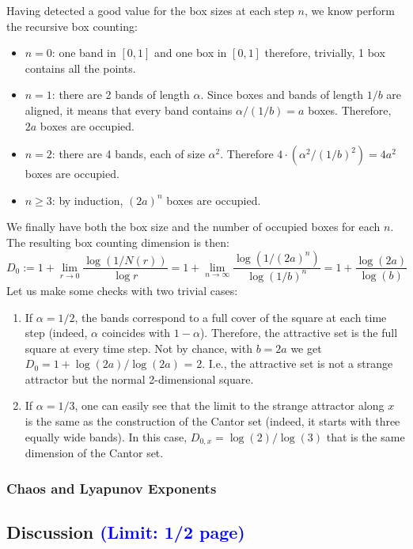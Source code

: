 \documentclass[11pt,titlepage]{article}
\begin{document}
Having detected a good value for the box sizes at each step $n$, we know perform the recursive box counting:
\begin{itemize}
	\item $n=0$: one band in $[0,1]$ and one box in $[0,1]$ therefore, trivially, 1 box contains all the points.
	\item $n=1$: there are 2 bands of length $\alpha$. Since boxes and bands of length $1/b$ are aligned, it means that every band contains $\alpha/(1/b) = a$ boxes. Therefore, $2a$ boxes are occupied.
	\item $n=2$: there are 4 bands, each of size $\alpha^2$. Therefore $4 \cdot (\alpha^2 / (1/b)^2) = 4a^2$ boxes are occupied.
	\item $n \ge 3$: by induction, $(2a)^n$ boxes are occupied.
\end{itemize}
We finally have both the box size and the number of occupied boxes for each $n$. The resulting box counting dimension is then:
\begin{equation*}
	D_0 := 1 + \lim_{r\rightarrow 0}\frac{\log(1/N(r))}{\log{r}} = 1 + \lim_{n\rightarrow \infty}\frac{\log(1/(2a)^n)}{\log{(1/b)^n}} = 1 + \frac{\log(2a)}{\log(b)}
\end{equation*}
Let us make some checks with two trivial cases:
 \begin{enumerate}
 	\item If $\alpha=1/2$, the bands correspond to a full cover of the square at each time step (indeed, $\alpha$ coincides with $1-\alpha$). Therefore, the attractive set is the full square at every time step. Not by chance, with $b=2a$ we get $D_0 = 1 + \log(2a)/\log(2a)$ = 2. I.e., the attractive set is not a strange attractor but the normal 2-dimensional square. 
 	\item If $\alpha=1/3$, one can easily see that the limit to the strange attractor along $x$ is the same as the construction of the Cantor set (indeed, it starts with three equally wide bands). In this case, $D_{0,x} = \log(2)/\log(3)$ that is the same dimension of the Cantor set.
 \end{enumerate}

\subsubsection{Chaos and Lyapunov Exponents}
\subsection{Discussion \textcolor{blue}{(Limit: 1/2 page)}} %
\end{document}
